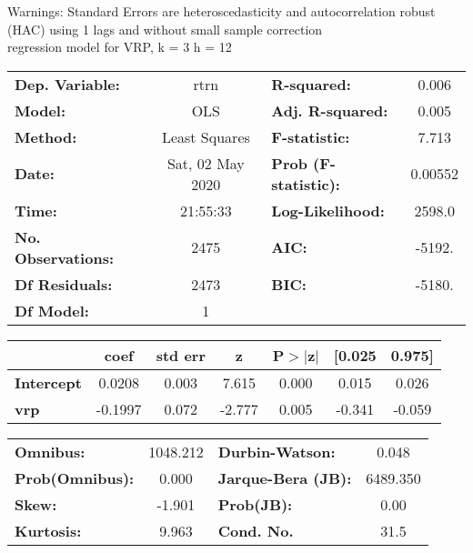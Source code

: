 Warnings: \newline
 [1] Standard Errors are heteroscedasticity and autocorrelation robust (HAC) using 1 lags and without small sample correction\\ 

regression model for VRP, k = 3 h = 12\begin{center}
\begin{tabular}{lclc}
\toprule
\textbf{Dep. Variable:}    &       rtrn       & \textbf{  R-squared:         } &     0.006   \\
\textbf{Model:}            &       OLS        & \textbf{  Adj. R-squared:    } &     0.005   \\
\textbf{Method:}           &  Least Squares   & \textbf{  F-statistic:       } &     7.713   \\
\textbf{Date:}             & Sat, 02 May 2020 & \textbf{  Prob (F-statistic):} &  0.00552    \\
\textbf{Time:}             &     21:55:33     & \textbf{  Log-Likelihood:    } &    2598.0   \\
\textbf{No. Observations:} &        2475      & \textbf{  AIC:               } &    -5192.   \\
\textbf{Df Residuals:}     &        2473      & \textbf{  BIC:               } &    -5180.   \\
\textbf{Df Model:}         &           1      & \textbf{                     } &             \\
\bottomrule
\end{tabular}
\begin{tabular}{lcccccc}
                   & \textbf{coef} & \textbf{std err} & \textbf{z} & \textbf{P$> |$z$|$} & \textbf{[0.025} & \textbf{0.975]}  \\
\midrule
\textbf{Intercept} &       0.0208  &        0.003     &     7.615  &         0.000        &        0.015    &        0.026     \\
\textbf{vrp}       &      -0.1997  &        0.072     &    -2.777  &         0.005        &       -0.341    &       -0.059     \\
\bottomrule
\end{tabular}
\begin{tabular}{lclc}
\textbf{Omnibus:}       & 1048.212 & \textbf{  Durbin-Watson:     } &    0.048  \\
\textbf{Prob(Omnibus):} &   0.000  & \textbf{  Jarque-Bera (JB):  } & 6489.350  \\
\textbf{Skew:}          &  -1.901  & \textbf{  Prob(JB):          } &     0.00  \\
\textbf{Kurtosis:}      &   9.963  & \textbf{  Cond. No.          } &     31.5  \\
\bottomrule
\end{tabular}
\end{center}


